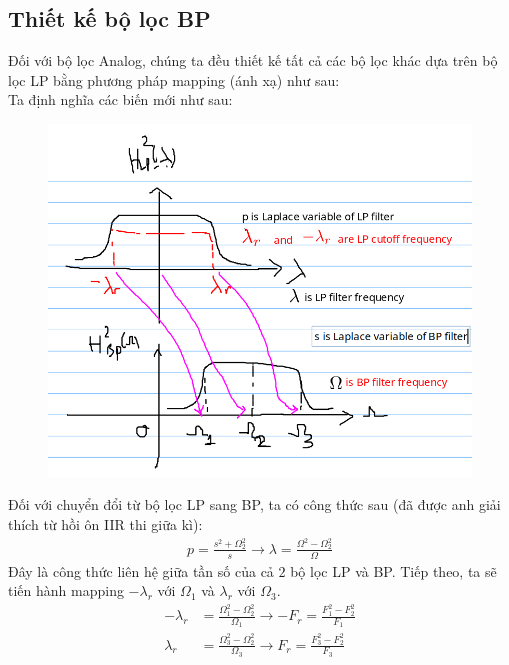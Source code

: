 \documentclass{article}
\begin{document}
\subsection{Thiết kế bộ lọc BP}
Đối với bộ lọc Analog, chúng ta đều thiết kế tất cả các bộ lọc khác dựa trên bộ lọc LP bằng phương pháp
mapping (ánh xạ) như sau:
\\ Ta định nghĩa các biến mới như sau:
\begin{figure}[H]
  \begin{center}
  \includegraphics[width=16cm]{10.png}
  \end{center}
  \end{figure}
Đối với chuyển đổi từ bộ lọc LP sang BP, ta có công thức sau (đã được anh giải thích từ hồi ôn IIR thi giữa kì):
\begin{equation*}
    \begin{split}
        p=\frac{s^2+\Omega_{2}^2}{s}\rightarrow \lambda=\frac{\Omega^2-\Omega_{2}^2}{\Omega}
    \end{split}
\end{equation*}
Đây là công thức liên hệ giữa tần số của cả $2$ bộ lọc LP và BP. Tiếp theo, ta sẽ tiến hành mapping $-\lambda_{r}$ với $\Omega_{1}$ và $\lambda_{r}$ với $\Omega_{3}$.
\begin{equation*}
    \begin{split}
        -\lambda_{r}&=\frac{\Omega_{1}^2-\Omega_{2}^2}{\Omega_{1}}\rightarrow -F_{r}=\frac{F_{1}^2-F_{2}^2}{F_{1}}\\
        \lambda_{r}&=\frac{\Omega_{3}^2-\Omega_{2}^2}{\Omega_{3}}\rightarrow F_{r}=\frac{F_{3}^2-F_{2}^2}{F_{3}}\\
    \end{split}
\end{equation*}
\end{document}
